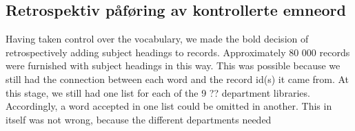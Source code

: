 \subsection{Retrospektiv påføring av kontrollerte emneord}

Having taken control over the vocabulary, we made the bold decision of retrospectively adding subject headings to records. Approximately 80 000 records were furnished with subject headings in this way. This was possible because we still had the connection between each word and the record id(s) it came from. At this stage, we still had one list for each of the 9 ?? department libraries. Accordingly, a word accepted in one list could be omitted in another. This in itself was not wrong, because the different departments needed 